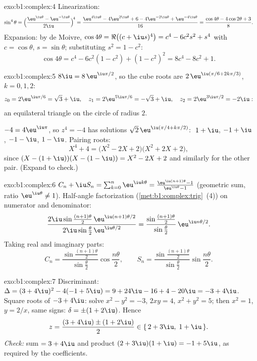 \begin{solution}{exo:b1:complex:4}
Linearization:
\[
\sin^4\theta
= \Bigl(\frac{\eu^{\iu\theta} - \eu^{-\iu\theta}}{2\iu}\Bigr)^{\!4}
= \frac{\eu^{4\iu\theta} - 4\eu^{2\iu\theta} + 6 - 4\eu^{-2\iu\theta}
+ \eu^{-4\iu\theta}}{16}
= \frac{\cos 4\theta - 4\cos 2\theta + 3}{8}.
\]
Expansion: by de Moivre, $\cos 4\theta = \Re\bigl((c +
\iu s)^4\bigr) = c^4 - 6c^2 s^2 + s^4$ with $c = \cos\theta$, $s =
\sin\theta$; substituting $s^2 = 1 - c^2$:
\[
\cos 4\theta = c^4 - 6c^2(1 - c^2) + (1 - c^2)^2
= 8c^4 - 8c^2 + 1 .
\]
\end{solution}

\begin{solution}{exo:b1:complex:5}
$8\iu = 8\,\eu^{\iu\pi/2}$, so the cube roots are $2\,\eu^{\iu(\pi/6 +
2k\pi/3)}$, $k = 0, 1, 2$:
\[
z_0 = 2\eu^{\iu\pi/6} = \sqrt 3 + \iu,\quad
z_1 = 2\eu^{5\iu\pi/6} = -\sqrt 3 + \iu,\quad
z_2 = 2\eu^{3\iu\pi/2} = -2\iu :
\]
an equilateral triangle on the circle of radius $2$.

$-4 = 4\eu^{\iu\pi}$, so $z^4 = -4$ has solutions $\sqrt 2\,
\eu^{\iu(\pi/4 + k\pi/2)}$: $\;1 + \iu$, $-1 + \iu$, $-1 - \iu$,
$1 - \iu$. Pairing  roots:
\[
X^4 + 4 = \bigl(X^2 - 2X + 2\bigr)\bigl(X^2 + 2X + 2\bigr),
\]
since $(X - (1+\iu))(X - (1-\iu)) = X^2 - 2X + 2$ and similarly for
the other pair. (Expand to check.)
\end{solution}

\begin{solution}{exo:b1:complex:6}
$C_n + \iu S_n = \sum_{k=0}^{n} \eu^{\iu k\theta} =
\frac{\eu^{\iu(n+1)\theta} - 1}{\eu^{\iu\theta} - 1}$ (geometric sum,
ratio $\eu^{\iu\theta} \neq 1$). Half-angle factorization
(\cref{met:b1:complex:trig}~(4)) on numerator and denominator:
\[
\frac{2\iu\sin\frac{(n+1)\theta}{2}\, \eu^{\iu(n+1)\theta/2}}
{2\iu\sin\frac{\theta}{2}\, \eu^{\iu\theta/2}}
= \frac{\sin\frac{(n+1)\theta}{2}}{\sin\frac{\theta}{2}}\,
\eu^{\iu n\theta/2}.
\]
Taking real and imaginary parts:
\[
C_n = \frac{\sin\frac{(n+1)\theta}{2}}{\sin\frac{\theta}{2}}
\cos\frac{n\theta}{2},
\qquad
S_n = \frac{\sin\frac{(n+1)\theta}{2}}{\sin\frac{\theta}{2}}
\sin\frac{n\theta}{2}.
\]
\end{solution}

\begin{solution}{exo:b1:complex:7}
Discriminant: $\Delta = (3 + 4\iu)^2 - 4(-1 + 5\iu) = 9 + 24\iu - 16 +
4 - 20\iu = -3 + 4\iu$. Square roots of $-3 + 4\iu$: solve $x^2 - y^2
= -3$, $2xy = 4$, $x^2 + y^2 = 5$; then $x^2 = 1$, $y = 2/x$, same
signs: $\delta = \pm(1 + 2\iu)$. Hence
\[
z = \frac{(3 + 4\iu) \pm (1 + 2\iu)}{2}
\in \{\, 2 + 3\iu,\; 1 + \iu \,\}.
\]
\emph{Check:} sum $= 3 + 4\iu$ and product $(2+3\iu)(1+\iu) = -1 +
5\iu$, as required by the coefficients.
\end{solution}

